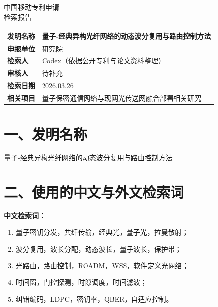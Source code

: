 \documentclass[12pt,a4paper]{article}
\begin{document}
\begin{center}
    {\Huge\heiti 中国移动专利申请} \\[0.5em]
    {\Huge\heiti 检索报告} \\[1em]
\end{center}

\begin{table}[h]
    \centering
    \renewcommand{\arraystretch}{1.8}
    \begin{tabular}{|p{3cm}|p{12cm}|}
        \hline
        \textbf{发明名称} & 量子-经典异构光纤网络的动态波分复用与路由控制方法 \\
        \hline
        \textbf{申报单位} & 研究院 \\
        \hline
        \textbf{检索人} & Codex（依据公开专利与论文资料整理） \\
        \hline
        \textbf{审核人} & 待补充 \\
        \hline
        \textbf{检索日期} & 2026.03.26 \\
        \hline
        \textbf{相关项目} & 量子保密通信网络与现网光传送网融合部署相关研究 \\
        \hline
    \end{tabular}
\end{table}

\noindent{}

\section*{一、发明名称}

量子-经典异构光纤网络的动态波分复用与路由控制方法

\section*{二、使用的中文与外文检索词}

\textbf{中文检索词：}
\begin{enumerate}[label=(\arabic*)]
    \item 量子密钥分发，共纤传输，经典光，量子光，拉曼散射；
    \item 波分复用，波长分配，动态波长，量子波长，保护带；
    \item 光路由，路由控制，ROADM，WSS，软件定义光网络；
    \item 时间窗，门控探测，时隙调度，时间滤波；
    \item 纠错编码，LDPC，密钥率，QBER，自适应控制。
\end{enumerate}
\end{document}
